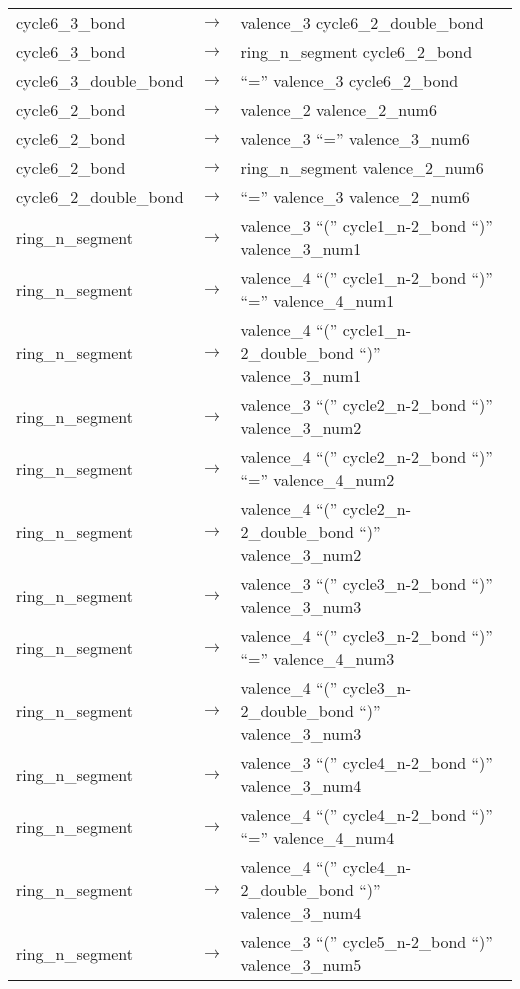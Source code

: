 \begin{longtable}{m{} p{} p{}}
    cycle6\_3\_bond & $\rightarrow$ & valence\_3 cycle6\_2\_double\_bond \\
    cycle6\_3\_bond & $\rightarrow$ & ring\_n\_segment cycle6\_2\_bond \\
    cycle6\_3\_double\_bond & $\rightarrow$ & ``='' valence\_3 cycle6\_2\_bond \\
    cycle6\_2\_bond & $\rightarrow$ & valence\_2 valence\_2\_num6 \\
    cycle6\_2\_bond & $\rightarrow$ & valence\_3 ``='' valence\_3\_num6 \\
    cycle6\_2\_bond & $\rightarrow$ & ring\_n\_segment valence\_2\_num6 \\
    cycle6\_2\_double\_bond & $\rightarrow$ & ``='' valence\_3 valence\_2\_num6 \\
    ring\_n\_segment & $\rightarrow$ & valence\_3 ``('' cycle1\_n-2\_bond ``)'' valence\_3\_num1 \\
    ring\_n\_segment & $\rightarrow$ & valence\_4 ``('' cycle1\_n-2\_bond ``)'' ``='' valence\_4\_num1 \\
    ring\_n\_segment & $\rightarrow$ & valence\_4 ``('' cycle1\_n-2\_double\_bond ``)'' valence\_3\_num1 \\
    ring\_n\_segment & $\rightarrow$ & valence\_3 ``('' cycle2\_n-2\_bond ``)'' valence\_3\_num2 \\
    ring\_n\_segment & $\rightarrow$ & valence\_4 ``('' cycle2\_n-2\_bond ``)'' ``='' valence\_4\_num2 \\
    ring\_n\_segment & $\rightarrow$ & valence\_4 ``('' cycle2\_n-2\_double\_bond ``)'' valence\_3\_num2 \\
    ring\_n\_segment & $\rightarrow$ & valence\_3 ``('' cycle3\_n-2\_bond ``)'' valence\_3\_num3 \\
    ring\_n\_segment & $\rightarrow$ & valence\_4 ``('' cycle3\_n-2\_bond ``)'' ``='' valence\_4\_num3 \\
    ring\_n\_segment & $\rightarrow$ & valence\_4 ``('' cycle3\_n-2\_double\_bond ``)'' valence\_3\_num3 \\
    ring\_n\_segment & $\rightarrow$ & valence\_3 ``('' cycle4\_n-2\_bond ``)'' valence\_3\_num4 \\
    ring\_n\_segment & $\rightarrow$ & valence\_4 ``('' cycle4\_n-2\_bond ``)'' ``='' valence\_4\_num4 \\
    ring\_n\_segment & $\rightarrow$ & valence\_4 ``('' cycle4\_n-2\_double\_bond ``)'' valence\_3\_num4 \\
    ring\_n\_segment & $\rightarrow$ & valence\_3 ``('' cycle5\_n-2\_bond ``)'' valence\_3\_num5 \\

\end{longtable}
